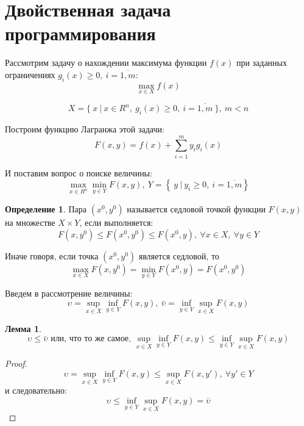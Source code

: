 \documentclass[12pt,a4paper,titlepage,oneside]{book}
\theoremstyle{definition}
\newtheorem{definition}{Определение}[chapter]
\theoremstyle{plain}
\theoremstyle{remark}
\theoremstyle{remark}
\theoremstyle{plain}
\newtheorem{lemma}{Лемма}[chapter]
\theoremstyle{plain}
\begin{document}
\section{Двойственная задача программирования}
Рассмотрим задачу о нахождении максимума функции $f(x)$ при заданных ограничениях $g_i(x) \geqslant 0,~ i = \overline{1,m}$:
\begin{equation}\label{eq:eq1}
\max_{x \in X} f(x)
\end{equation}

\begin{equation}\label{eq:eq2}
X=\{~x~|~x \in \textit{R} ^n,~g_i(x) \geqslant 0,~i = \overline{1,m}~\},~m < n
\end{equation}

Построим функцию Лагранжа этой задачи:
\begin{equation} \label{eq:eq3}
F(x,y)=f(x)+ \sum_{i=1}^m y_i g_i(x)
\end{equation}

И поставим вопрос о поиске величины:
\begin{equation} \label{eq:eq4}
 \max_{x \in \textit{R} ^n} \min_{y \in Y} F(x,y),~ Y= \left\{~y~|~y_i \geqslant 0, ~i = \overline{1,m}\right\}
\end{equation}


\begin{definition}
Пара $(x^0,y^0)$ называется седловой точкой функции $F(x,y)$ на множестве $X \times Y$, если выполняется:
$$F(x,y^0) \leqslant F(x^0,y^0) \leqslant F(x^0,y),~ \forall x\in X,~ \forall y \in  Y $$	
\end{definition}

Иначе говоря, если точка $(x^0,y^0)$ является седловой, то
$$ \max_{x \in X}F(x,y^0) = \min_{y \in Y}F(x^0,y) = F(x^0,y^0)$$

Введем в рассмотрение величины:
$$\upsilon = \sup_{x \in X} \inf_{y \in Y} F(x,y),~\bar{\upsilon}=\inf_{y \in Y}\sup_{x \in X} F(x,y)$$

\begin{lemma} \label{lem:lem1}
$$\upsilon \leqslant \bar{\upsilon} \text{ или, что то же самое, } \sup_{x \in X} \inf_{y \in Y} F(x,y) \leqslant \inf_{y \in Y}\sup_{x \in X} F(x,y)$$
\end{lemma}

\begin{proof}
$$\upsilon = \sup_{x \in X} \inf_{y \in Y} F(x,y) \leqslant \sup_{x \in X}F(x,y'),~ \forall y' \in Y$$
и следовательно:
$$\upsilon \leqslant \inf_{y \in Y}\sup_{x \in X} F(x,y) = \bar{\upsilon}$$	

\end{proof}
\end{document}
